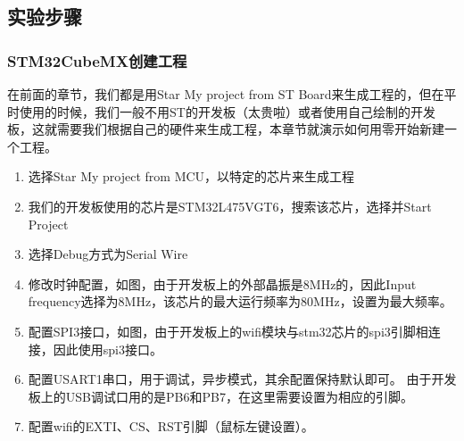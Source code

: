 \documentclass[a4paper,12pt,english]{sphinxmanual}
\begin{document}
\subsection{实验步骤}
\label{\detokenize{exp-stm32/mqtt:id6}}

\subsubsection{STM32CubeMX创建工程}
\label{\detokenize{exp-stm32/mqtt:stm32cubemx}}
\sphinxAtStartPar
在前面的章节，我们都是用Star My project from ST Board来生成工程的，但在平时使用的时候，我们一般不用ST的开发板（太贵啦）或者使用自己绘制的开发板，这就需要我们根据自己的硬件来生成工程，本章节就演示如何用零开始新建一个工程。

\sphinxAtStartPar
{}
\begin{enumerate}
%
\item {} 
\sphinxAtStartPar
选择Star My project from MCU，以特定的芯片来生成工程

\item {} 
\sphinxAtStartPar
我们的开发板使用的芯片是STM32L475VGT6，搜索该芯片，选择并Start Project

\item {} 
\sphinxAtStartPar
选择Debug方式为Serial Wire

\item {} 
\sphinxAtStartPar
修改时钟配置，如图，由于开发板上的外部晶振是8MHz的，因此Input frequency选择为8MHz，该芯片的最大运行频率为80MHz，设置为最大频率。

\item {} 
\sphinxAtStartPar
配置SPI3接口，如图，由于开发板上的wifi模块与stm32芯片的spi3引脚相连接，因此使用spi3接口。

\item {} 
\sphinxAtStartPar
配置USART1串口，用于调试，异步模式，其余配置保持默认即可。
由于开发板上的USB调试口用的是PB6和PB7，在这里需要设置为相应的引脚。

\sphinxAtStartPar
{}

\item {} 
\sphinxAtStartPar
配置wifi的EXTI、CS、RST引脚（鼠标左键设置）。


\end{enumerate}
\end{document}
